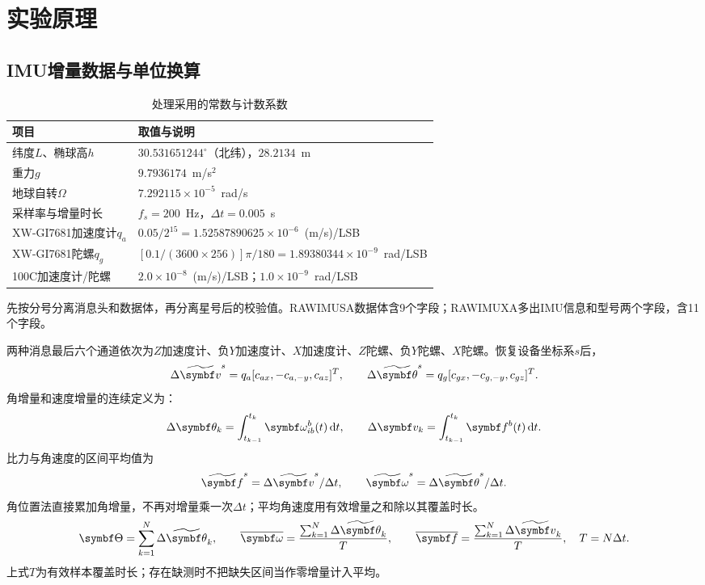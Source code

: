 \section{实验原理}

\subsection{IMU增量数据与单位换算}
\begin{table}[htbp]\centering\small
\caption{处理采用的常数与计数系数}\label{tab:constants}
\begin{tabularx}{\textwidth}{p{4.5cm}Y}\toprule
项目&取值与说明\\\midrule
纬度$L$、椭球高$h$&$30.531651244^\circ$（北纬），$28.2134$~m\\
重力$g$&$9.7936174$~m/s$^2$\\
地球自转$\Omega$&$7.292115\times10^{-5}$~rad/s\\
采样率与增量时长&$f_s=200$~Hz，$\Delta t=0.005$~s\\
XW-GI7681加速度计$q_a$&$0.05/2^{15}=1.52587890625\times10^{-6}$~(m/s)/LSB\\
XW-GI7681陀螺$q_g$&$[0.1/(3600\times256)]\pi/180=1.89380344\times10^{-9}$~rad/LSB\\
100C加速度计/陀螺&$2.0\times10^{-8}$~(m/s)/LSB；$1.0\times10^{-9}$~rad/LSB\\\bottomrule
\end{tabularx}\end{table}

先按分号分离消息头和数据体，再分离星号后的校验值。RAWIMUSA数据体含9个字段；RAWIMUXA多出IMU信息和型号两个字段，含11个字段。

两种消息最后六个通道依次为$Z$加速度计、负$Y$加速度计、$X$加速度计、$Z$陀螺、负$Y$陀螺、$X$陀螺。恢复设备坐标系$s$后，
\begin{equation}
\Delta\widetilde{\matr v}^{s}=q_a[c_{ax},-c_{a,-y},c_{az}]^T,\qquad
\Delta\widetilde{\matr\theta}^{s}=q_g[c_{gx},-c_{g,-y},c_{gz}]^T.
\end{equation}
角增量和速度增量的连续定义为：
\begin{equation}
\Delta\matr\theta_k=\int_{t_{k-1}}^{t_k}\matr\omega_{ib}^{b}(t)\,\mathrm dt,\qquad
\Delta\matr v_k=\int_{t_{k-1}}^{t_k}\matr f^{b}(t)\,\mathrm dt.
\label{eq:increments}\end{equation}
比力与角速度的区间平均值为
\begin{equation}
\widetilde{\matr f}^{s}=\Delta\widetilde{\matr v}^{s}/\Delta t,\qquad
\widetilde{\matr\omega}^{s}=\Delta\widetilde{\matr\theta}^{s}/\Delta t.
\end{equation}
角位置法直接累加角增量，不再对增量乘一次$\Delta t$；平均角速度用有效增量之和除以其覆盖时长。
\begin{equation}
\matr\Theta=\sum_{k=1}^{N}\Delta\widetilde{\matr\theta}_k,\qquad
\overline{\matr\omega}=\frac{\sum_{k=1}^{N}\Delta\widetilde{\matr\theta}_k}{T},\qquad
\overline{\matr f}=\frac{\sum_{k=1}^{N}\Delta\widetilde{\matr v}_k}{T},\quad T=N\Delta t.
\end{equation}
上式$T$为有效样本覆盖时长；存在缺测时不把缺失区间当作零增量计入平均。

